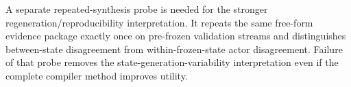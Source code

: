 A separate repeated-synthesis probe is needed for the stronger regeneration/reproducibility interpretation. It repeats the same free-form evidence package exactly once on pre-frozen validation streams and distinguishes between-state disagreement from within-frozen-state actor disagreement. Failure of that probe removes the state-generation-variability interpretation even if the complete compiler method improves utility.
